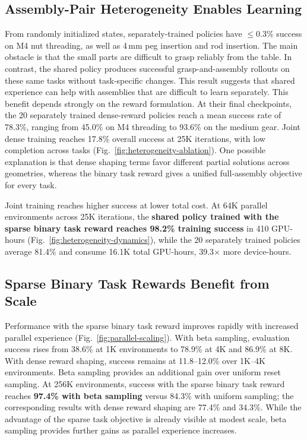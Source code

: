\subsection{Assembly-Pair Heterogeneity Enables Learning}
From randomly initialized states, separately-trained policies have $\leq$0.3\% success on M4 nut threading, as well as 4\,mm peg insertion and rod
insertion. The main obstacle is that the small parts are
difficult to grasp reliably from the table. 
In contrast, the shared
policy produces successful grasp-and-assembly rollouts on these same tasks
without task-specific changes. This result suggests that shared experience
can help with assemblies that are difficult to learn separately.
This benefit depends strongly on the reward formulation.
At their final checkpoints, the 20 separately trained dense-reward policies
reach a mean success rate of 78.3\%, ranging from 45.0\% on
M4 threading to 93.6\% on the medium gear. Joint dense training reaches 17.8\%
overall success at 25K iterations, with low completion across tasks
(Fig.~\ref{fig:heterogeneity-ablation}).
One possible explanation
is that dense shaping terms favor different partial solutions across geometries,
whereas the binary task reward gives a unified full-assembly objective for every task.


Joint training reaches higher success at lower total cost.
At 64K parallel environments across 25K iterations, the \textbf{shared policy trained with the sparse binary task reward reaches 98.2\% training success} in 410 GPU-hours
(Fig.~\ref{fig:heterogeneity-dynamics}), while the 20 separately trained policies average 81.4\% and consume 16.1K total GPU-hours,
39.3$\times$ more device-hours.

\subsection{Sparse Binary Task Rewards Benefit from Scale}
Performance with the sparse binary task reward improves rapidly with increased parallel experience (Fig.~\ref{fig:parallel-scaling}).
With beta sampling, evaluation success rises from
38.6\% at 1K environments to 78.9\% at 4K and 86.9\% at 8K.
With dense reward shaping, success remains at 11.8--12.0\% over 1K--4K environments.
Beta sampling provides an additional gain over uniform reset sampling. At 256K environments, success with the sparse binary task reward reaches \textbf{97.4\% with beta sampling} versus 84.3\% with uniform sampling; the corresponding results with dense reward shaping are 77.4\% and 34.3\%. While the advantage of the sparse task objective is already visible at modest scale, beta sampling provides further gains as
parallel experience increases.



